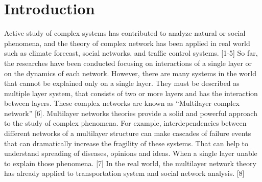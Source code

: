 \documentclass[english]{cccconf}
\begin{document}


\section{Introduction}

 Active study of complex systems has contributed to analyze natural or social phenomena, and the theory of complex network has been applied in real world such as climate forecast, social networks, and traffic control systems. [1-5]
So far, the researches have been conducted focusing on interactions of a single layer or on the dynamics of each network. However, there are many systems in the world that cannot be explained only on a single layer. They must be described as multiple layer system, that consists of two or more layers and has the interaction between layers. These complex networks are known  as ``Multilayer complex network'' [6].
Multilayer networks theories provide a solid and powerful approach to the study of complex phenomena. For example, interdependencies between different networks of a multilayer structure can make cascades of failure events that can dramatically increase the fragility of these systems. That can help to understand spreading of diseases, opinions and ideas. When a single layer unable to explain those phenomena. [7] In the real world, the multilayer network theory has already applied to transportation system and social network analysis. [8] 
\end{document}
